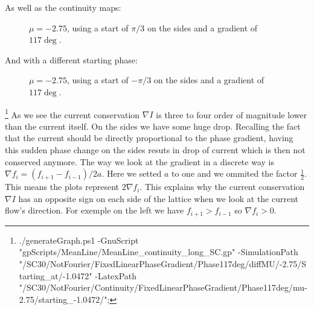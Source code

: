\documentclass[../main.tex]{subfiles}
\begin{document}
As well as the continuity maps:
\begin{figure}[H]
    \centering
    
    \caption{$\mu = -2.75$, using a start of $\pi/3$ on the sides and a gradient of $117\si{\deg}$.}
\end{figure}
And  with a different starting phase:
\begin{figure}[H]
    \centering
    
    \caption{$\mu = -2.75$, using a start of $-\pi/3$ on the sides and a gradient of $117\si{\deg}$.}
\end{figure}
\footnote{./generateGraph.ps1 -GnuScript "gpScripts/MeanLine/MeanLine\_continuity\_long\_SC.gp" -SimulationPath "/SC30/NotFourier/FixedLinearPhaseGradient/Phase117deg/diffMU/-2.75/Starting\_at/-1.0472" -LatexPath "/SC30/NotFourier/Continuity/FixedLinearPhaseGradient/Phase117deg/mu-2.75/starting\_-1.0472/";}
As we see the current conservation $\nabla I$ is three to four order of magnitude lower than the current itself. On the sides we have some huge drop. 
Recalling the fact that the current should be directly proportional to the phase gradient, having this sudden phase change 
on the sides resuts in drop of current which is then not conserved anymore. The way we look at the gradient in a discrete
way is $\nabla f_i = (f_{i+1} - f_{i-1})/2a$. Here we setted $a$ to one and we ommited the factor $\frac{1}{2}$. This
means the plots represent $2\nabla f_i$. This explains why the current conservation $\nabla I$ has an opposite sign on each side of the lattice
when we look at the current flow's direction. For exemple on the left we have $f_{i+1} > f_{i-1}$ so $\nabla f_i > 0$. 
\end{document}
